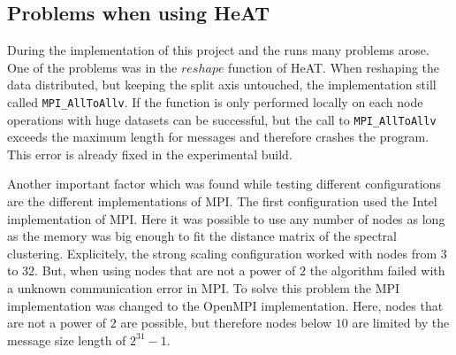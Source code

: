 \subsection{Problems when using HeAT}
\label{subsec:problems_when_using_heat}
During the implementation of this project and the runs many problems arose.
One of the problems was in the \(reshape\) function of \gls{HeAT}.
When reshaping the data distributed, but keeping the split axis untouched, the implementation still called \lstinline{MPI_AllToAllv}.
If the function is only performed locally on each node operations with huge datasets can be successful, but the call to \lstinline{MPI_AllToAllv} exceeds the maximum length
for messages and therefore crashes the program.
This error is already fixed in the experimental build.

Another important factor which was found while testing different configurations are the different implementations of \gls{MPI}.
The first configuration used the Intel implementation of \gls{MPI}. Here it was possible to use any number of nodes as long as
the memory was big enough to fit the distance matrix of the spectral clustering. Explicitely, the strong scaling configuration worked
with nodes from \(3\) to \(32\). But, when using nodes that are not a power of \(2\) the algorithm failed with a unknown communication error in \gls{MPI}.
To solve this problem the \gls{MPI} implementation was changed to the OpenMPI implementation.
Here, nodes that are not a power of \(2\) are possible, but therefore nodes below \(10\) are limited by the message size length of \(2^{31} - 1\).
